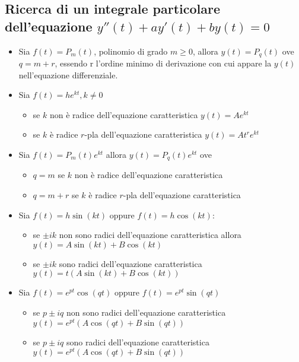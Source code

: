 \documentclass[10pt,a4paper,fleqn]{article}
\begin{document}
    \subsection*{Ricerca di un integrale particolare\\dell'equazione $y''(t)+ay'(t)+by(t)=0$}
    \begin{itemize}
        \item Sia $f(t)=P_m(t)$, polinomio di grado $m \geq 0$, allora $y(t)=P_q(t)$ ove $q=m+r$, essendo r l'ordine minimo di derivazione con cui appare la $y(t)$ nell’equazione differenziale.
        \item Sia $f(t)=he^{kt}, k \not = 0$
        \begin{itemize}
            \item se $k$ non è radice dell'equazione caratteristica $y(t)=Ae^{kt}$
            \item se $k$ è radice $r$-pla dell'equazione caratteristica $y(t)=At^re^{kt}$
        \end{itemize}
        \item Sia $f(t)=P_m(t)e^{kt}$ allora $y(t)=P_q(t)e^{kt}$ ove
        \begin{itemize}
            \item $q=m$ se $k$ non è radice dell'equazione caratteristica
            \item $q=m+r$ se $k$ è radice $r$-pla dell'equazione caratteristica
        \end{itemize}
        \item Sia $f(t)=h\sin(kt)$ oppure $f(t)=h\cos(kt)$:
        \begin{itemize}
            \item se $\pm ik$ non sono radici dell'equazione caratteristica allora $y(t)=A\sin(kt)+B\cos(kt)$
            \item se $\pm ik$ sono radici dell'equazione caratteristica $y(t)=t(A\sin(kt)+B\cos(kt))$
        \end{itemize}
        \item Sia $f(t)=e^{pt} \cos(qt)$ oppure $f(t)=e^{pt} \sin(qt)$
        \begin{itemize}
            \item se $p \pm iq$ non sono radici dell'equazione caratteristica $y(t)=e^{pt} (A \cos(qt) + B \sin(qt))$
            \item se $p \pm iq$ sono radici dell'equazione caratteristica
            $y(t)=e^{pt} (A \cos(qt) + B \sin(qt))$
        \end{itemize}
    \end{itemize}
    \pagebreak
\end{document}
